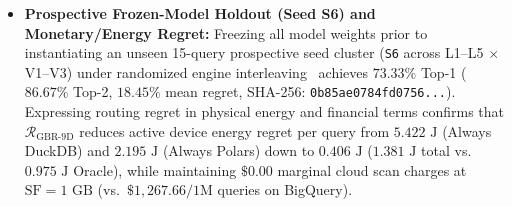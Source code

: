 \documentclass[10pt,a4paper]{article}
\begin{document}
\begin{itemize}
    \item \textbf{Prospective Frozen-Model Holdout (Seed S6) and Monetary/Energy Regret:} Freezing all model weights prior to instantiating an unseen 15-query prospective seed cluster (\texttt{S6} across L1--L5 $\times$ V1--V3) under randomized engine interleaving~\cite{raasveldt2018fair} achieves $73.33\%$ Top-1 ($86.67\%$ Top-2, $18.45\%$ mean regret, SHA-256: \texttt{0b85ae0784fd0756...}). Expressing routing regret in physical energy and financial terms confirms that $\mathcal{R}_{\text{GBR-9D}}$ reduces active device energy regret per query from $5.422\text{ J}$ (Always DuckDB) and $2.195\text{ J}$ (Always Polars) down to $0.406\text{ J}$ ($1.381\text{ J}$ total vs.\ $0.975\text{ J}$ Oracle), while maintaining $\$0.00$ marginal cloud scan charges at $\text{SF}=1\text{ GB}$ (vs.\ $\$1,267.66/\text{1M}$ queries on BigQuery).
\end{itemize}
\end{document}
